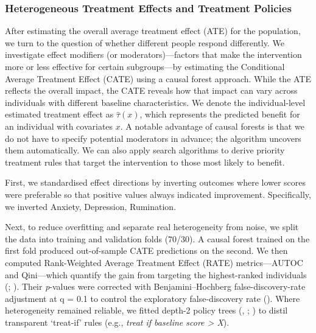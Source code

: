 \documentclass[
  single column]{article}
\begin{document}
\subsubsection{Heterogeneous Treatment Effects and Treatment
Policies}\label{heterogeneous-treatment-effects-and-treatment-policies}

After estimating the overall average treatment effect (ATE) for the
population, we turn to the question of whether different people respond
differently. We investigate effect modifiers (or moderators)---factors
that make the intervention more or less effective for certain
subgroups---by estimating the Conditional Average Treatment Effect
(CATE) using a causal forest approach. While the ATE reflects the
overall impact, the CATE reveals how that impact can vary across
individuals with different baseline characteristics. We denote the
individual-level estimated treatment effect as \(\hat{\tau}(x)\), which
represents the predicted benefit for an individual with covariates
\(x\). A notable advantage of causal forests is that we do not have to
specify potential moderators in advance; the algorithm uncovers them
automatically. We can also apply search algorithms to derive priority
treatment rules that target the intervention to those most likely to
benefit.

First, we standardised effect directions by inverting outcomes where
lower scores were preferable so that positive values always indicated
improvement. Specifically, we inverted Anxiety, Depression, Rumination.

Next, to reduce overfitting and separate real heterogeneity from noise,
we split the data into training and validation folds (70/30). A causal
forest trained on the first fold produced out-of-sample CATE predictions
on the second. We then computed Rank-Weighted Average Treatment Effect
(RATE) metrics---AUTOC and Qini---which quantify the gain from targeting
the highest-ranked individuals (; ). Their
\emph{p}-values were corrected with Benjamini--Hochberg
false-discovery-rate adjustment at q = 0.1 to control the exploratory
false-discovery rate (). Where heterogeneity remained reliable, we fitted
depth-2 policy trees (,
;
) to distil
transparent `treat-if' rules (e.g., \emph{treat if baseline score
\textgreater{} X}).
\end{document}
